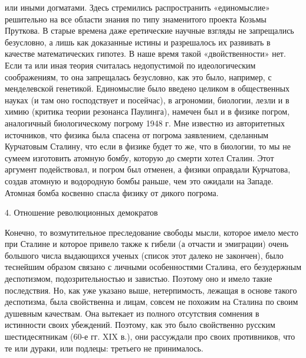 или  иными догматами.  Здесь  стремились распространить  «единомыслие»
решительно на  все области знания  по типу знаменитого  проекта Козьмы
Пруткова.  В  старые  времена  даже  еретические  научные  взгляды  не
запрещались безусловно, а лишь как  доказанные истины и разрешалось их
развивать  в  качестве  математических  гипотез. В  наше  время  такой
«двойственности» нет.  Если та или иная  теория считалась недопустимой
по идеологическим соображениям, то она запрещалась безусловно, как это
было,  например, с  менделевской генетикой.  Единомыслие было  введено
целиком в общественных  науках (и там оно господствует  и посейчас), в
агрономии,  биологии,  лезли  и  в  химию  (критика  теории  резонанса
Паулинга), намечен  был и в физике  погром, аналогичный биологическому
погрому 1948  г. Мне известно  из авторитетных источников,  что физика
была спасена от погрома  заявлением, сделанным Курчатовым Сталину, что
если  в  физике  будет  то  же,  что  в  биологии,  то  мы  не  сумеем
изготовить  атомную  бомбу,  которую  до  смерти  хотел  Сталин.  Этот
аргумент  подействовал,  и  погром  был отменен,  а  физики  оправдали
Курчатова, создав атомную  и водородную бомбы раньше,  чем это ожидали
на Западе. Атомная бомба косвенно спасла физику от дикого погрома.

4. Отношение революционных демократов

Конечно, то возмутительное преследование  свободы мысли, которое имело
место  при Сталине  и  которое привело  также к  гибели  (а отчасти  и
эмиграции) очень большого числа  выдающихся ученых (список этот далеко
не закончен),  было теснейшим образом связано  с личными особенностями
Сталина,  его безудержным  деспотизмом, подозрительностью  и завистью.
Поэтому  оно и  имело такие  последствия.  Но, как  уже указано  выше,
нетерпимость, лежащая  в основе такого деспотизма,  была свойственна и
лицам, совсем не  похожим на Сталина по своим  душевным качествам. Она
вытекает из полного отсутствия  сомнения в истинности своих убеждений.
Поэтому, как  это было  свойственно русским шестидесятникам  (60-е гг.
XIX в.), они рассуждали про своих  противников, что те или дураки, или
подлецы: третьего не принималось.

